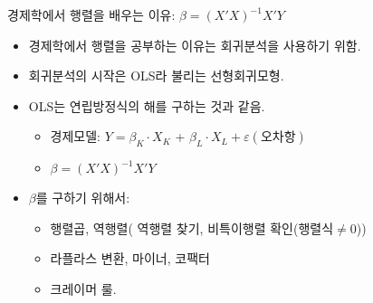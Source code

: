\documentclass[aspectratio=169]{beamer}
\begin{document}
\begin{frame}{경제학에서 행렬을 배우는 이유: $\beta=(X'X)^{-1}X'Y$}
  \begin{itemize}
    \item 경제학에서 행렬을 공부하는 이유는 회귀분석을 사용하기 위함.
    \item 회귀분석의 시작은 OLS라 불리는 선형회귀모형.
    \item OLS는 연립방정식의 해를 구하는 것과 같음.
    \begin{itemize}
      \item 경제모델: $Y = \beta_{K}\cdot X_K$ + $\beta_{L}\cdot X_L + \varepsilon(\text{오차항})$
      \item $\beta=(X'X)^{-1}X'Y$
    \end{itemize}
    \item $\beta$를 구하기 위해서:
    \begin{itemize}
      \item 행렬곱, 역행렬( 역행렬 찾기, 비특이행렬 확인(행렬식$\neq 0$))
      \item 라플라스 변환, 마이너, 코팩터
      \item 크레이머 룰.
    \end{itemize}
  \end{itemize}
\end{frame}
\end{document}
